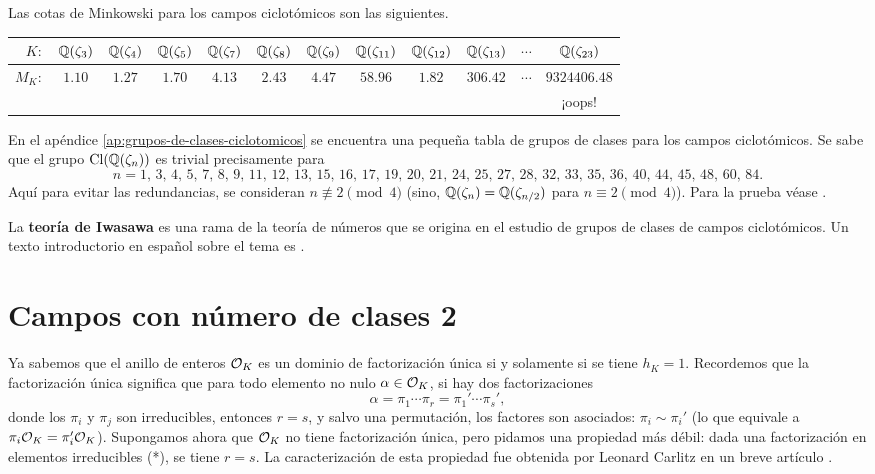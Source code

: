 Las cotas de Minkowski para los campos ciclotómicos son las siguientes.

\begin{center}\renewcommand{\arraystretch}{1.5}
  \begin{tabular}{rccccccccccc}
    \hline
    $K\colon$ & $\mathbb{Q} (\zeta_3)$ & $\mathbb{Q} (\zeta_4)$ & $\mathbb{Q} (\zeta_5)$ & $\mathbb{Q} (\zeta_7)$ & $\mathbb{Q} (\zeta_8)$ & $\mathbb{Q} (\zeta_9)$ & $\mathbb{Q} (\zeta_{11})$ & $\mathbb{Q} (\zeta_{12})$ & $\mathbb{Q} (\zeta_{13})$ & $\cdots$ & $\mathbb{Q} (\zeta_{23})$ \tabularnewline
    \hline
    $M_K\colon$ & $1.10$ & $1.27$ & $1.70$ & $4.13$ & $2.43$ & $4.47$ & $58.96$ & $1.82$ & $306.42$ & $\cdots$ & $9324406.48$ \tabularnewline
    \hline
    & & & & & & & & & & & ¡oops! \tabularnewline
  \end{tabular}
\end{center}

En el apéndice \ref{ap:grupos-de-clases-ciclotomicos} se encuentra una pequeña
tabla de grupos de clases para los campos ciclotómicos. Se sabe que el grupo
$\operatorname{Cl} (\mathbb{Q} (\zeta_n))$ es trivial precisamente para
$$n = 1, \, 3, \, 4, \, 5, \, 7, \, 8, \, 9, \, 11, \, 12, \, 13, \, 15, \, 16, \, 17, \, 19, \, 20, \, 21, \, 24, \, 25, \, 27, \, 28, \, 32, \, 33, \, 35, \, 36, \, 40, \, 44, \, 45, \, 48, \, 60, \, 84.$$
Aquí para evitar las redundancias, se consideran $n \not\equiv 2 \pmod{4}$
(sino, $\mathbb{Q} (\zeta_n) = \mathbb{Q} (\zeta_{n/2})$ para $n \equiv 2 \pmod{4}$).
Para la prueba véase \cite[Chapter 11]{Washington-GTM83}.

\vspace{1em}

La \textbf{teoría de Iwasawa} es una rama de la teoría de números que se origina
en el estudio de grupos de clases de campos ciclotómicos. Un texto introductorio
en español sobre el tema es \cite{Futterer-Villanueva}.


\section{Campos con número de clases 2}

Ya sabemos que el anillo de enteros $\mathcal{O}_K$ es un dominio de factorización única
si y solamente si se tiene ${h_K = 1}$. Recordemos que la factorización única
significa que para todo elemento no nulo $\alpha \in \mathcal{O}_K$, si hay dos
factorizaciones
\[ \tag{*} \alpha = \pi_1 \cdots \pi_r = \pi_1' \cdots \pi_s', \]
donde los $\pi_i$ y $\pi_j$ son irreducibles, entonces $r = s$, y salvo una
permutación, los factores son asociados: $\pi_i \sim \pi_i'$ (lo que equivale a
$\pi_i \mathcal{O}_K = \pi_i' \mathcal{O}_K$). Supongamos ahora que $\mathcal{O}_K$ no tiene factorización
única, pero pidamos una propiedad más débil: dada una factorización en
elementos irreducibles (*), se tiene $r = s$. La caracterización de esta
propiedad fue obtenida por Leonard Carlitz en un breve artículo
\cite{Carlitz-1960}.

